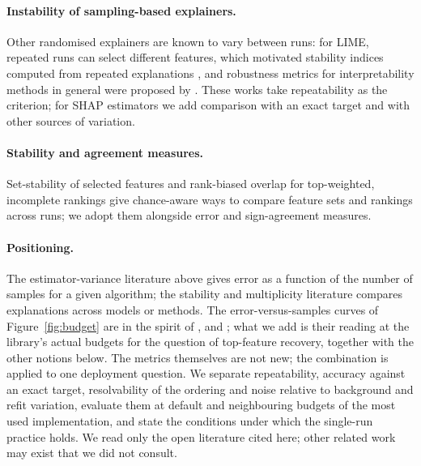 \paragraph{Instability of sampling-based explainers.}
Other randomised explainers are known to vary between runs: for LIME, repeated runs can select different features, which motivated stability indices computed from repeated explanations \citep{visani2022stability}, and robustness metrics for interpretability methods in general were proposed by \citet{alvarezmelis2018robustness}. These works take repeatability as the criterion; for SHAP estimators we add comparison with an exact target and with other sources of variation.

\paragraph{Stability and agreement measures.}
Set-stability of selected features \citep{nogueira2018stability} and rank-biased overlap for top-weighted, incomplete rankings \citep{webber2010rbo} give chance-aware ways to compare feature sets and rankings across runs; we adopt them alongside error and sign-agreement measures.

\paragraph{Positioning.}
The estimator-variance literature above gives error as a function of the number of samples for a given algorithm; the stability and multiplicity literature compares explanations across models or methods. The error-versus-samples curves of Figure~\ref{fig:budget} are in the spirit of \citet{covert2021improving}, \citet{mitchell2022sampling} and \citet{musco2025leverage}; what we add is their reading at the library's actual budgets for the question of top-feature recovery, together with the other notions below. The metrics themselves are not new; the combination is applied to one deployment question. We separate repeatability, accuracy against an exact target, resolvability of the ordering and noise relative to background and refit variation, evaluate them at default and neighbouring budgets of the most used implementation, and state the conditions under which the single-run practice holds. We read only the open literature cited here; other related work may exist that we did not consult.
